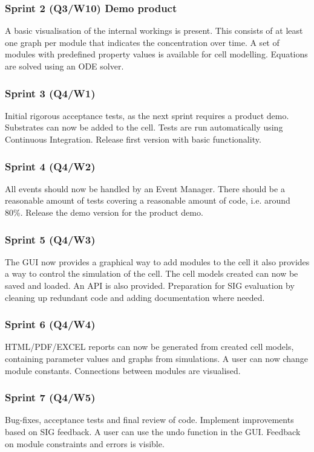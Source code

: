 \documentclass[10pt,a4paper]{report}
\begin{document}
			\subsubsection*{Sprint 2 (Q3/W10) Demo product}
				A basic visualisation of the internal workings is present. This consists of at least one graph per module that indicates the concentration over time. A set of modules with predefined property values is available for cell modelling. Equations are solved using an ODE solver.
			\subsubsection*{Sprint 3 (Q4/W1)}
				Initial rigorous acceptance tests, as the next sprint requires a product demo. Substrates can now be added to the cell. Tests are run automatically using Continuous Integration. Release first version with basic functionality.
			\subsubsection*{Sprint 4 (Q4/W2)}
				All events should now be handled by an Event Manager. There should be a reasonable amount of tests covering a reasonable amount of code, i.e. around 80\%. Release the demo version for the product demo.
			\subsubsection*{Sprint 5 (Q4/W3)}
				The GUI now provides a graphical way to add modules to the cell it also provides a way to control the simulation of the cell. The cell models created can now be saved and loaded. An API is also provided. Preparation for SIG evaluation by cleaning up redundant code and adding documentation where needed.
			\subsubsection*{Sprint 6 (Q4/W4)}
				HTML/PDF/EXCEL reports can now be generated from created cell models, containing parameter values and graphs from simulations. A user can now change module constants. Connections between modules are visualised. 
			\subsubsection*{Sprint 7 (Q4/W5)}
				Bug-fixes, acceptance tests and final review of code. Implement improvements based on SIG feedback. A user can use the undo function in the GUI. Feedback on module constraints and errors is visible.
\end{document}
